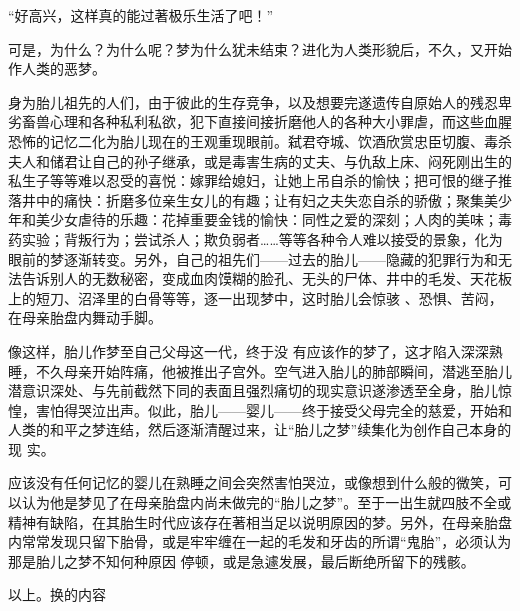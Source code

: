 \documentclass{article}
\begin{document}
“好高兴，这样真的能过著极乐生活了吧！”

可是，为什么？为什么呢？梦为什么犹未结束？进化为人类形貌后，不久，又开始作人类的恶梦。
\newpage


身为胎儿祖先的人们，由于彼此的生存竞争，以及想要完遂遗传自原始人的残忍卑劣畜兽心理和各种私利私欲，犯下直接间接折磨他人的各种大小罪虐，而这些血腥恐怖的记忆二化为胎儿现在的王观重现眼前。弑君夺城、饮酒欣赏忠臣切腹、毒杀夫人和储君让自己的孙子继承，或是毒害生病的丈夫、与仇敌上床、闷死刚出生的私生子等等难以忍受的喜悦：嫁罪给媳妇，让她上吊自杀的愉快；把可恨的继子推落井中的痛快：折磨多位亲生女儿的有趣；让有妇之夫失恋自杀的骄傲；聚集美少年和美少女虐待的乐趣：花掉重要金钱的愉快：同性之爱的深刻；人肉的美味；毒药实验；背叛行为；尝试杀人；欺负弱者……等等各种令人难以接受的景象，化为眼前的梦逐渐转变。另外，自己的祖先们——过去的胎儿——隐藏的犯罪行为和无法告诉别人的无数秘密，变成血肉馍糊的脸孔、无头的尸体、井中的毛发、天花板上的短刀、沼泽里的白骨等等，逐一出现梦中，这时胎儿会惊骇
、恐惧、苦闷，在母亲胎盘内舞动手脚。 

像这样，胎儿作梦至自己父母这一代，终于没
\newpage
有应该作的梦了，这才陷入深深熟睡，不久母亲开始阵痛，他被推出子宫外。空气进入胎儿的肺部瞬间，潜逃至胎儿潜意识深处、与先前截然下同的表面且强烈痛切的现实意识遂渗透至全身，胎儿惊惶，害怕得哭泣出声。似此，胎儿——婴儿——终于接受父母完全的慈爱，开始和人类的和平之梦连结，然后逐渐清醒过来，让“胎儿之梦”续集化为创作自己本身的现
实。 

应该没有任何记忆的婴儿在熟睡之间会突然害怕哭泣，或像想到什么般的微笑，可以认为他是梦见了在母亲胎盘内尚未做完的“胎儿之梦”。至于一出生就四肢不全或精神有缺陷，在其胎生时代应该存在著相当足以说明原因的梦。另外，在母亲胎盘内常常发现只留下胎骨，或是牢牢缠在一起的毛发和牙齿的所谓“鬼胎”，必须认为那是胎儿之梦不知何种原因
停顿，或是急遽发展，最后断绝所留下的残骸。 

以上。换的内容
\end{document}
